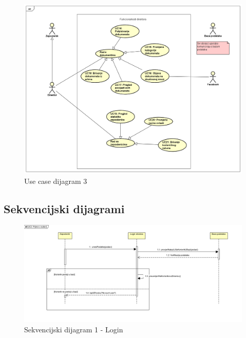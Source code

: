 				\begin{figure}[H]
					\includegraphics[scale=0.4]{slike/dijagram_obrasca_uporabe_3.PNG} %
					\centering
					\caption{Use case dijagram 3}
					\label{fig:promjene}
				\end{figure}
				
			\subsection{Sekvencijski dijagrami}
				
				\begin{figure}[H]
					\includegraphics[scale=0.5]{slike/sd1.PNG} %
					\centering
					\caption{Sekvencijski dijagram 1 - Login}
					\label{fig:promjene}
				\end{figure}

